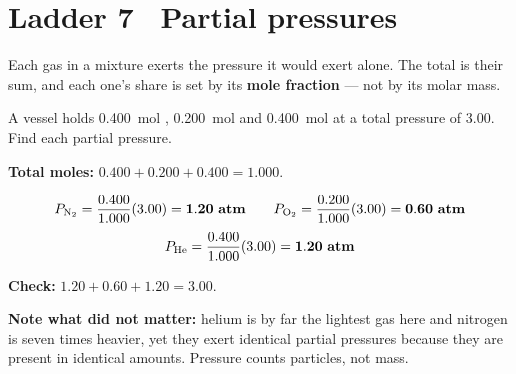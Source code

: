 \documentclass{apchem-worksheet}
\begin{document}
\section*{\sffamily Ladder 7 \textbullet\ Partial pressures}

Each gas in a mixture exerts the pressure it would exert alone. The total
is their sum, and each one's share is set by its \textbf{mole fraction} ---
not by its molar mass.

\begin{workedexample}
A vessel holds \SI{0.400}{\mole} , \SI{0.200}{\mole}  and
\SI{0.400}{\mole}  at a total pressure of \SI{3.00}{\atm}. Find
each partial pressure.

\textbf{Total moles:} $0.400 + 0.200 + 0.400 = \num{1.000}$.

\[ P_{\ce{N2}} = \frac{0.400}{1.000}(3.00) = \mathbf{1.20~atm} \qquad
   P_{\ce{O2}} = \frac{0.200}{1.000}(3.00) = \mathbf{0.60~atm} \]
\[ P_{\ce{He}} = \frac{0.400}{1.000}(3.00) = \mathbf{1.20~atm} \]

\textbf{Check:} $1.20 + 0.60 + 1.20 = 3.00$. \checkmark

\textbf{Note what did not matter:} helium is by far the lightest gas here
and nitrogen is seven times heavier, yet they exert identical partial
pressures because they are present in identical amounts. Pressure counts
particles, not mass.
\end{workedexample}
\end{document}
